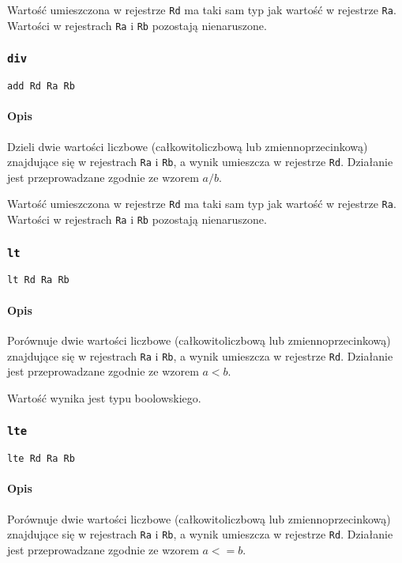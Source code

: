 Wartość umieszczona w rejestrze \texttt{Rd} ma taki sam typ jak wartość w
rejestrze \texttt{Ra}. Wartości w rejestrach \texttt{Ra} i \texttt{Rb} pozostają
nienaruszone.

\subsubsection{\texttt{div}}

\begin{lstlisting}
add Rd Ra Rb
\end{lstlisting}

\paragraph*{Opis} Dzieli dwie wartości liczbowe (całkowitoliczbową lub
zmiennoprzecinkową) znajdujące się w rejestrach \texttt{Ra} i \texttt{Rb}, a
wynik umieszcza w rejestrze \texttt{Rd}. Działanie jest przeprowadzane zgodnie
ze wzorem $a / b$.

Wartość umieszczona w rejestrze \texttt{Rd} ma taki sam typ jak wartość w
rejestrze \texttt{Ra}. Wartości w rejestrach \texttt{Ra} i \texttt{Rb} pozostają
nienaruszone.

\subsubsection{\texttt{lt}}

\begin{lstlisting}
lt Rd Ra Rb
\end{lstlisting}

\paragraph*{Opis} Porównuje dwie wartości liczbowe (całkowitoliczbową lub
zmiennoprzecinkową) znajdujące się w rejestrach \texttt{Ra} i \texttt{Rb}, a
wynik umieszcza w rejestrze \texttt{Rd}. Działanie jest przeprowadzane zgodnie
ze wzorem $a < b$.

Wartość wynika jest typu boolowskiego.

\subsubsection{\texttt{lte}}

\begin{lstlisting}
lte Rd Ra Rb
\end{lstlisting}

\paragraph*{Opis} Porównuje dwie wartości liczbowe (całkowitoliczbową lub
zmiennoprzecinkową) znajdujące się w rejestrach \texttt{Ra} i \texttt{Rb}, a
wynik umieszcza w rejestrze \texttt{Rd}. Działanie jest przeprowadzane zgodnie
ze wzorem $a <= b$.

